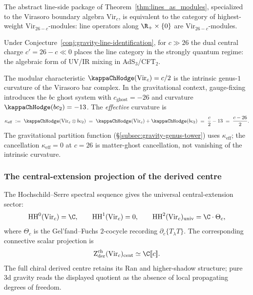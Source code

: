 \begin{conjecture}
\label{conj:gravity-line-identification}
The abstract line-side package of
Theorem~\textup{\ref{thm:lines_as_modules}}, specialized to the
Virasoro boundary algebra $\mathrm{Vir}_c$, is equivalent to the
category of highest-weight $\mathrm{Vir}_{26-c}$-modules: line
operators along $\R_+ \times \{0\}$ are
$\mathrm{Vir}_{26-c}$-modules.
\end{conjecture}

\begin{remark}
Under Conjecture~\ref{conj:gravity-line-identification},
for $c \gg 26$ the dual central charge $c' = 26 - c \ll 0$ places
the line category in the strongly quantum regime: the algebraic
form of UV/IR mixing in AdS$_3$/CFT$_2$.
\end{remark}

\begin{remark}
\label{rem:gravity-kappa-vs-kappa-eff}
The modular characteristic $\kappaChHodge(\mathrm{Vir}_c) = c/2$ is the
intrinsic genus-$1$ curvature of the Virasoro bar complex. In the
gravitational context, gauge-fixing introduces the $bc$ ghost system
with $c_{\mathrm{ghost}} = -26$ and curvature
$\kappaChHodge(bc_2) = -13$. The \emph{effective} curvature is
\[
\kappa_{\mathrm{eff}}
\;:=\;
\kappaChHodge(\mathrm{Vir}_c \otimes bc_2)
\;=\;
\kappaChHodge(\mathrm{Vir}_c) + \kappaChHodge(bc_2)
\;=\;
\frac{c}{2} - 13
\;=\;
\frac{c - 26}{2}.
\]
The gravitational partition function
(\S\ref{subsec:gravity-genus-tower}) uses $\kappa_{\mathrm{eff}}$;
the cancellation $\kappa_{\mathrm{eff}} = 0$ at $c = 26$ is
matter-ghost cancellation, not vanishing of the intrinsic curvature.
\end{remark}

\subsubsection*{The central-extension projection of the derived centre}

The Hochschild--Serre spectral sequence gives the universal
central-extension sector:
\[
\HH^0(\mathrm{Vir}_c) = \C,
\qquad
\HH^1(\mathrm{Vir}_c) = 0,
\qquad
\HH^2(\mathrm{Vir}_c)_{\mathrm{univ}} = \C \cdot \Theta_c,
\]
where $\Theta_c$ is the Gel'fand--Fuchs $2$-cocycle recording
$\partial_c\{T_\lambda T\}$. The corresponding connective scalar
projection is
\[
\Zder^{\mathrm{ch}}(\mathrm{Vir}_c)_{\mathrm{cent}}
\simeq \C[\![c]\!].
\]
The full chiral derived centre retains its Ran and higher-shadow
structure; pure 3d gravity reads the displayed quotient as the
absence of local propagating degrees of freedom.

